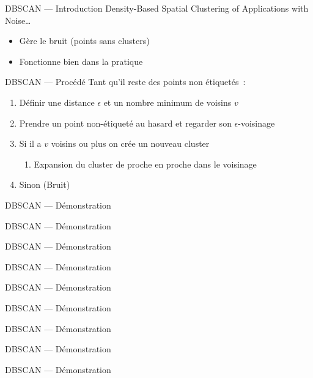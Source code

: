 
\begin{frame}{DBSCAN --- Introduction}
  Density-Based Spatial Clustering of Applications with Noise…

  \begin{itemize}[<+->]
    \item Gère le bruit (points sans clusters)
    \item Fonctionne bien dans la pratique
  \end{itemize}
\end{frame}

\begin{frame}{DBSCAN --- Procédé}
  Tant qu'il reste des points non étiquetés~:

  \begin{enumerate}
  \item Définir une distance $\epsilon$ et un nombre minimum de voisins $v$
  \item Prendre un point non-étiqueté au hasard et regarder son $\epsilon$-voisinage
  \item Si il a $v$ voisins ou plus on crée un nouveau cluster
    \begin{enumerate}
    \item Expansion du cluster de proche en proche dans le voisinage
    \end{enumerate}
  \item Sinon (Bruit)
  \end{enumerate}
\end{frame}

\begin{frame}{DBSCAN --- Démonstration}
\end{frame}

\begin{frame}{DBSCAN --- Démonstration}
\end{frame}

\begin{frame}{DBSCAN --- Démonstration}
\end{frame}

\begin{frame}{DBSCAN --- Démonstration}
\end{frame}

\begin{frame}{DBSCAN --- Démonstration}
\end{frame}

\begin{frame}{DBSCAN --- Démonstration}
\end{frame}

\begin{frame}{DBSCAN --- Démonstration}
\end{frame}

\begin{frame}{DBSCAN --- Démonstration}
\end{frame}

\begin{frame}{DBSCAN --- Démonstration}
\end{frame}

